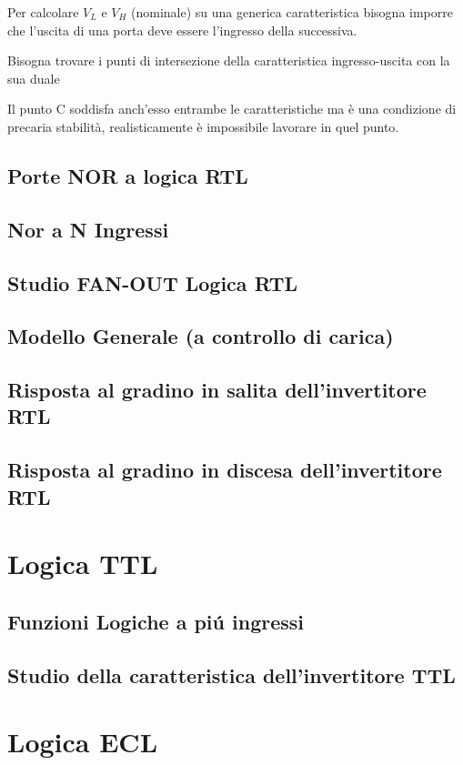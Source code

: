 \documentclass{article}
\begin{document}
Per calcolare $V_L$ e $V_H$ (nominale) su una generica caratteristica bisogna imporre che l'uscita di una porta deve essere l'ingresso della successiva.

Bisogna trovare i punti di intersezione della caratteristica ingresso-uscita con la sua duale

Il punto C soddisfa anch'esso entrambe le caratteristiche ma è una condizione di precaria stabilità, realisticamente è impossibile lavorare in quel punto.

\subsection{Porte NOR a logica RTL}
\begin{tikzpicture}
\end{tikzpicture}

\subsection{Nor a N Ingressi}
\subsection{Studio FAN-OUT Logica RTL}
\subsection{Modello Generale (a controllo di carica)}
\subsection{Risposta al gradino in salita dell'invertitore RTL}
\subsection{Risposta al gradino in discesa dell'invertitore RTL}
\section{Logica TTL}
\subsection{Funzioni Logiche a pi\'u ingressi}
\subsection{Studio della caratteristica dell'invertitore TTL}
\section{Logica ECL}
\end{document}
